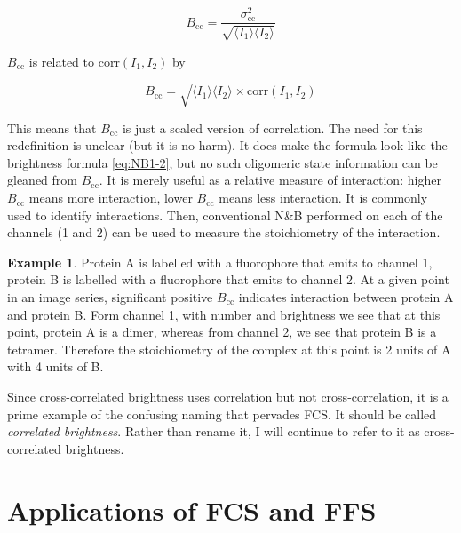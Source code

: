 \documentclass[12pt,]{book}
\theoremstyle{definition}
\theoremstyle{definition}
\newtheorem{example}{Example}[chapter]
\theoremstyle{definition}
\theoremstyle{remark}
\let\BeginKnitrBlock\begin \let\EndKnitrBlock\end
\begin{document}
\BeginKnitrBlock{definition}[cross-correlated brightness]
\protect\hypertarget{def:unnamed-chunk-27}{}{\label{def:unnamed-chunk-27}
\iffalse (cross-correlated brightness) \fi{} }

\begin{equation}
B_\text{cc} = \frac{\sigma^2_\text{cc}}{\sqrt{\langle I_1 \rangle \langle I_2 \rangle}}
\label{eq:cross-corr-nb}
\end{equation}
\EndKnitrBlock{definition}

\(B_\text{cc}\) is related to \(\text{corr}(I_1, I_2)\) by

\begin{equation}
B_\text{cc} = \sqrt{\langle I_1 \rangle \langle I_2 \rangle} \times \text{corr}(I_1, I_2)
\label{eq:bcc-corr}
\end{equation}

This means that \(B_\text{cc}\) is just a scaled version of correlation.
The need for this redefinition is unclear (but it is no harm). It does
make the formula look like the brightness formula \eqref{eq:NB1-2}, but no
such oligomeric state information can be gleaned from \(B_\text{cc}\).
It is merely useful as a relative measure of interaction: higher
\(B_\text{cc}\) means more interaction, lower \(B_\text{cc}\) means less
interaction. It is commonly used to identify interactions. Then,
conventional N\&B performed on each of the channels (1 and 2) can be
used to measure the stoichiometry of the interaction.

\begin{example} 
Protein A is labelled with a fluorophore that emits to channel 1, protein B is labelled with a fluorophore that emits to channel 2. At a given point in an image series, significant positive $B_\text{cc}$ indicates interaction between protein A and protein B. Form channel 1, with number and brightness we see that at this point, protein A is a dimer, whereas from channel 2, we see that protein B is a tetramer. Therefore the stoichiometry of the complex at this point is 2 units of A with 4 units of B.
\end{example}

\BeginKnitrBlock{remark}
\iffalse{} {Remark. } \fi{}Since cross-correlated brightness uses
correlation but not cross-correlation, it is a prime example of the
confusing naming that pervades FCS. It should be called \emph{correlated
brightness}. Rather than rename it, I will continue to refer to it as
cross-correlated brightness.
\EndKnitrBlock{remark}

\section{Applications of FCS and FFS}\label{applications-of-fcs-and-ffs}
\end{document}
